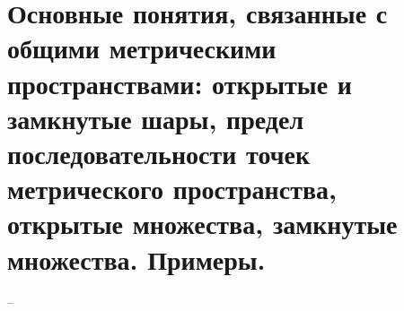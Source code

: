 \section{Основные понятия, связанные с общими метрическими пространствами: открытые и замкнутые шары, предел последовательности точек метрического пространства, открытые множества, замкнутые множества. Примеры.}
--
\newline